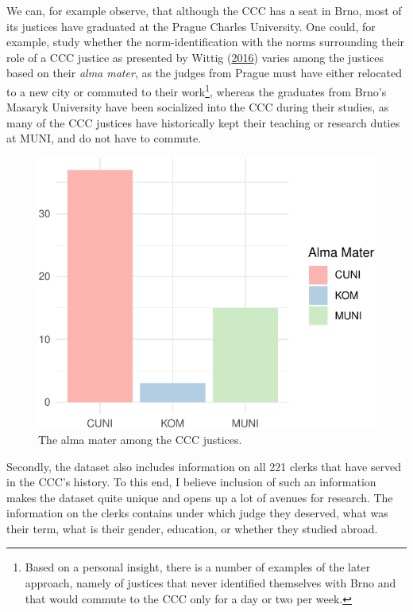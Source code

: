 \documentclass[
  11pt,
]{article}
\begin{document}
We can, for example observe, that although the CCC has a seat in Brno,
most of its justices have graduated at the Prague Charles University.
One could, for example, study whether the norm-identification with the
norms surrounding their role of a CCC justice as presented by Wittig
(\protect\hyperlink{ref-wittigOccurrenceSeparateOpinions2016}{2016})
varies among the justices based on their \emph{alma mater}, as the
judges from Prague must have either relocated to a new city or commuted
to their work\footnote{Based on a personal insight, there is a number of
  examples of the later approach, namely of justices that never
  identified themselves with Brno and that would commute to the CCC only
  for a day or two per week.}, whereas the graduates from Brno's Masaryk
University have been socialized into the CCC during their studies, as
many of the CCC justices have historically kept their teaching or
research duties at MUNI, and do not have to commute.

\begin{figure}
\centering
\includegraphics{ANONYMIZED_The_Czech_Constitutional_Court_Dataset_files/figure-latex/alma-1.pdf}
\caption{The alma mater among the CCC justices.}
\end{figure}

Secondly, the dataset also includes information on all 221 clerks that
have served in the CCC's history. To this end, I believe inclusion of
such an information makes the dataset quite unique and opens up a lot of
avenues for research. The information on the clerks contains under which
judge they deserved, what was their term, what is their gender,
education, or whether they studied abroad.
\end{document}
